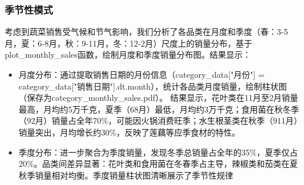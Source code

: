 \documentclass{cumcmthesis} %
\begin{document}
\subsubsection{季节性模式}
考虑到蔬菜销售受气候和节气影响，我们分析了各品类在月度和季度（春：3-5月，夏：6-8月，秋：9-11月，冬：12-2月）尺度上的销量分布，基于plot\_monthly\_sales函数，绘制月度和季度销量分布图。结果显示：
\begin{itemize}
    \item 月度分布：通过提取销售日期的月份信息（category\_data["月份"] = category\_data["销售日期"].dt.month），统计各品类月度销量，绘制柱状图（保存为{category}\_monthly\_sales.pdf）。
    结果显示，花叶类在11月至2月销量最高，月均约5万千克，夏季（6\-8月）最低，月均约3万千克；食用菌在秋冬季（9\-2月）销量占全年70\%，可能因火锅消费旺季；水生根茎类在秋季（9\-11月）销量突出，月均增长约30\%，反映了莲藕等应季食材的特性。
    
    \item 季度分布：进一步聚合为季度销量，发现冬季总销量占全年的35\%，夏季仅占20\%。品类间差异显著：花叶类和食用菌在冬春季占主导，辣椒类和茄类在夏秋季销量相对均衡。季度销量柱状图清晰展示了季节性规律
\end{itemize}
\end{document}
